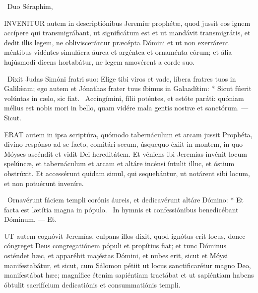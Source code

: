 \R\ Duo Séraphim, 




\lettrine[lines=2]{I}{NVENITUR} autem in descriptiónibus Jeremíæ prophétæ, quod jussit eos ignem accípere qui transmigrábant, ut significátum est et ut mandávit transmigrátis, et dedit illis legem, ne obliviscerántur præcépta Dómini et ut non exerrárent méntibus vidéntes simulácra áurea et argéntea et ornaménta eórum; et ália hujúsmodi dicens hortabátur, ne legem amovérent a corde suo.

\R\ Dixit Judas Simóni fratri suo: Elige tibi viros et vade, líbera fratres tuos in Galilǽam; ego autem et Jónathas frater tuus íbimus in Galaadítim: * Sicut fúerit volúntas in cælo, sic fiat. \V\ Accingímini, fílii poténtes, et estóte paráti: quóniam mélius est nobis mori in bello, quam vidére mala gentis nostræ et sanctórum. — Sicut.


\lettrine[lines=2]{E}{RAT} autem in ipsa scriptúra, quómodo tabernáculum et arcam jussit Prophéta, divíno respónso ad se facto, comitári secum, úsquequo éxiit in montem, in quo Móyses ascéndit et vidit Dei hereditátem. Et véniens ibi Jeremías invénit locum spelúncæ, et tabernáculum et arcam et altáre incénsi íntulit illuc, et óstium obstrúxit. Et accessérunt quidam simul, qui sequebántur, ut notárent sibi locum, et non potuérunt inveníre.

\R\ Ornavérunt fáciem templi corónis áureis, et dedicavérunt altáre Dómino: * Et facta est lætítia magna in pópulo. \V\ In hymnis et confessiónibus benedicébant Dóminum. — Et.



\lettrine[lines=2]{U}{T} autem cognóvit Jeremías, culpans illos dixit, quod ignótus erit locus, donec cóngreget Deus congregatiónem pópuli et propítius fiat; et tunc Dóminus osténdet hæc, et apparébit majéstas Dómini, et nubes erit, sicut et Móysi manifestabátur, et sicut, cum Sálomon pétiit ut locus sanctificarétur magno Deo, manifestábat hæc; magnífice étenim sapiéntiam tractábat et ut sapiéntiam habens óbtulit sacrifícium dedicatiónis et consummatiónis templi.

